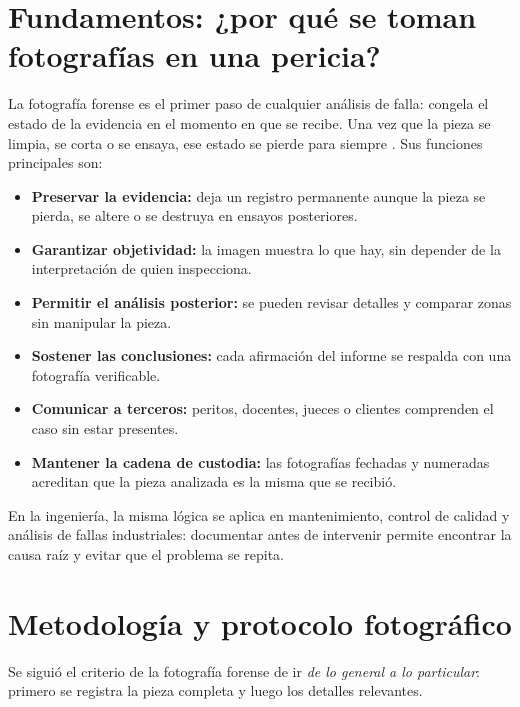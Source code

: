 \documentclass[runningheads]{llncs}
\begin{document}
\section{Fundamentos: ¿por qué se toman fotografías en una pericia?}

La fotografía forense es el primer paso de cualquier análisis de falla: congela el estado de la evidencia en el momento en que se recibe. Una vez que la pieza se limpia, se corta o se ensaya, ese estado se pierde para siempre \cite{astm860,asm11}. Sus funciones principales son:

\begin{itemize}
\item \textbf{Preservar la evidencia:} deja un registro permanente aunque la pieza se pierda, se altere o se destruya en ensayos posteriores.
\item \textbf{Garantizar objetividad:} la imagen muestra lo que hay, sin depender de la interpretación de quien inspecciona.
\item \textbf{Permitir el análisis posterior:} se pueden revisar detalles y comparar zonas sin manipular la pieza.
\item \textbf{Sostener las conclusiones:} cada afirmación del informe se respalda con una fotografía verificable.
\item \textbf{Comunicar a terceros:} peritos, docentes, jueces o clientes comprenden el caso sin estar presentes.
\item \textbf{Mantener la cadena de custodia:} las fotografías fechadas y numeradas acreditan que la pieza analizada es la misma que se recibió.
\end{itemize}

En la ingeniería, la misma lógica se aplica en mantenimiento, control de calidad y análisis de fallas industriales: documentar antes de intervenir permite encontrar la causa raíz y evitar que el problema se repita.

\section{Metodología y protocolo fotográfico}

Se siguió el criterio de la fotografía forense de ir \emph{de lo general a lo particular}: primero se registra la pieza completa y luego los detalles relevantes.
\end{document}
